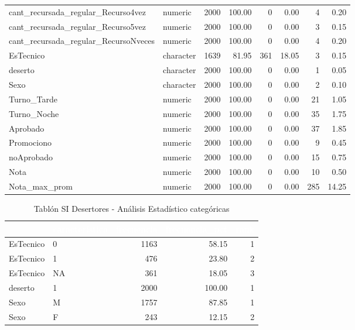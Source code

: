\begin{table}[!h]
{\begin{tabular}[t]{llrrrrrr}
			cant\_recursada\_regular\_Recurso4vez & numeric & 2000 & 100.00 & 0 & 0.00 & 4 & 0.20\\
			\rowcolor{gray!6}  cant\_recursada\_regular\_Recurso5vez & numeric & 2000 & 100.00 & 0 & 0.00 & 3 & 0.15\\
			\addlinespace
			cant\_recursada\_regular\_RecursoNveces & numeric & 2000 & 100.00 & 0 & 0.00 & 4 & 0.20\\
			\rowcolor{gray!6}  EsTecnico & character & 1639 & 81.95 & 361 & 18.05 & 3 & 0.15\\
			deserto & character & 2000 & 100.00 & 0 & 0.00 & 1 & 0.05\\
			\rowcolor{gray!6}  Sexo & character & 2000 & 100.00 & 0 & 0.00 & 2 & 0.10\\
			Turno\_Tarde & numeric & 2000 & 100.00 & 0 & 0.00 & 21 & 1.05\\
			\addlinespace
			\rowcolor{gray!6}  Turno\_Noche & numeric & 2000 & 100.00 & 0 & 0.00 & 35 & 1.75\\
			Aprobado & numeric & 2000 & 100.00 & 0 & 0.00 & 37 & 1.85\\
			\rowcolor{gray!6}  Promociono & numeric & 2000 & 100.00 & 0 & 0.00 & 9 & 0.45\\
			noAprobado & numeric & 2000 & 100.00 & 0 & 0.00 & 15 & 0.75\\
			\rowcolor{gray!6}  Nota & numeric & 2000 & 100.00 & 0 & 0.00 & 10 & 0.50\\
			\addlinespace
			Nota\_max\_prom & numeric & 2000 & 100.00 & 0 & 0.00 & 285 & 14.25\\
			\bottomrule
	\end{tabular}}
\end{table}

\begin{table}[!h]
	
	\caption{\label{tab:tablon_deserto_est_cat}Tablón SI Desertores - Análisis Estadístico categóricas}
	\centering
		\begin{tabular}[t]{llrrr}
			\toprule
			\rowcolor{black}  \multicolumn{1}{c}{\textcolor{white}{\textbf{variable}}} & \multicolumn{1}{c}{\textcolor{white}{\textbf{característica}}} & \multicolumn{1}{c}{\textcolor{white}{\textbf{frecuencia}}} & \multicolumn{1}{c}{\textcolor{white}{\textbf{frecuencia\_pct}}} & \multicolumn{1}{c}{\textcolor{white}{\textbf{rank}}}\\
			\midrule
			\rowcolor{gray!6}  EsTecnico & 0 & 1163 & 58.15 & 1\\
			EsTecnico & 1 & 476 & 23.80 & 2\\
			\rowcolor{gray!6}  EsTecnico & NA & 361 & 18.05 & 3\\
			deserto & 1 & 2000 & 100.00 & 1\\
			\rowcolor{gray!6}  Sexo & M & 1757 & 87.85 & 1\\
			\addlinespace
			Sexo & F & 243 & 12.15 & 2\\
			\bottomrule
	\end{tabular}%
\end{table}

